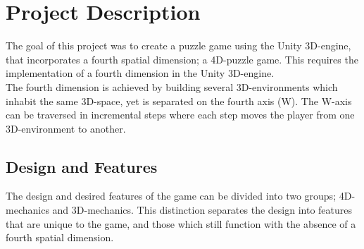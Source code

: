 \section{Project Description}
The goal of this project was to create a puzzle game using the Unity 3D-engine, that incorporates a fourth spatial dimension; a 4D-puzzle game. This requires the implementation of a fourth dimension in the Unity 3D-engine.\\

The fourth dimension is achieved by building several 3D-environments which inhabit the same 3D-space, yet is separated on the fourth axis (W). The W-axis can be traversed in incremental steps where each step moves the player from one 3D-environment to another.
 
\subsection{Design and Features}
The design and desired features of the game can be divided into two groups; 4D-mechanics and 3D-mechanics. This distinction separates the design into features that are unique to the game, and those which still function with the absence of a fourth spatial dimension.

